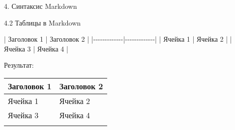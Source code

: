 \documentclass[
  ignorenonframetext,
  aspectratio=169,
]{beamer}
\newenvironment{Shaded}{\begin{snugshade}}{\end{snugshade}}
\newcommand{\NormalTok}[1]{\textcolor[rgb]{0.00,0.23,0.31}{#1}}
\begin{document}
\begin{frame}[fragile]{4. Синтаксис Markdown}
\begin{block}{4.2 Таблицы в Markdown}
\label{ux442ux430ux431ux43bux438ux446ux44b-ux432-markdown}
\begin{Shaded}
\begin{Highlighting}[]
\NormalTok{| Заголовок 1 | Заголовок 2 |}
\NormalTok{|{-}{-}{-}{-}{-}{-}{-}{-}{-}{-}{-}{-}{-}|{-}{-}{-}{-}{-}{-}{-}{-}{-}{-}{-}{-}{-}|}
\NormalTok{| Ячейка 1    | Ячейка 2    |}
\NormalTok{| Ячейка 3    | Ячейка 4    |}
\end{Highlighting}
\end{Shaded}

Результат:

\begin{longtable}[]{@{}ll@{}}
\toprule\noalign{}
Заголовок 1 & Заголовок 2 \\
\midrule\noalign{}
\endhead
Ячейка 1 & Ячейка 2 \\
Ячейка 3 & Ячейка 4 \\
\bottomrule\noalign{}
\end{longtable}
\end{block}
\end{frame}
\end{document}
